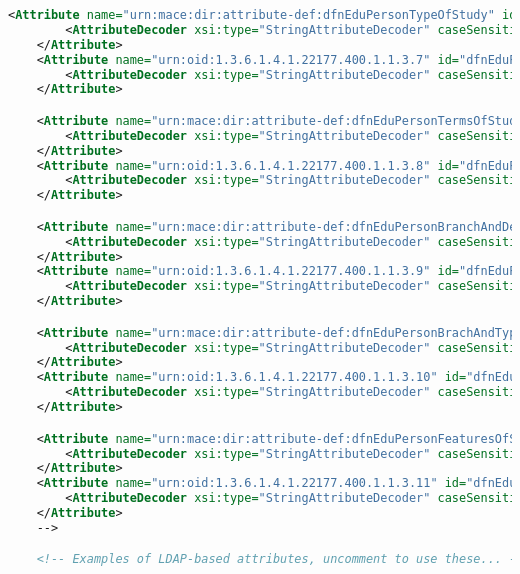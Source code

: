\begin{lstlisting}[language=xml]
    <Attribute name="urn:mace:dir:attribute-def:dfnEduPersonTypeOfStudy" id="dfnEduPersonTypeOfStudy">
        <AttributeDecoder xsi:type="StringAttributeDecoder" caseSensitive="false"/>
    </Attribute>
    <Attribute name="urn:oid:1.3.6.1.4.1.22177.400.1.1.3.7" id="dfnEduPersonTypeOfStudy">
        <AttributeDecoder xsi:type="StringAttributeDecoder" caseSensitive="false"/>
    </Attribute>

    <Attribute name="urn:mace:dir:attribute-def:dfnEduPersonTermsOfStudy" id="dfnEduPersonTermsOfStudy">
        <AttributeDecoder xsi:type="StringAttributeDecoder" caseSensitive="false"/>
    </Attribute>
    <Attribute name="urn:oid:1.3.6.1.4.1.22177.400.1.1.3.8" id="dfnEduPersonTermsOfStudy">
        <AttributeDecoder xsi:type="StringAttributeDecoder" caseSensitive="false"/>
    </Attribute>

    <Attribute name="urn:mace:dir:attribute-def:dfnEduPersonBranchAndDegree" id="dfnEduPersonBranchAndDegree">
        <AttributeDecoder xsi:type="StringAttributeDecoder" caseSensitive="false"/>
    </Attribute>
    <Attribute name="urn:oid:1.3.6.1.4.1.22177.400.1.1.3.9" id="dfnEduPersonBranchAndDegree">
        <AttributeDecoder xsi:type="StringAttributeDecoder" caseSensitive="false"/>
    </Attribute>

    <Attribute name="urn:mace:dir:attribute-def:dfnEduPersonBrachAndType" id="dfnEduPersonBrachAndType">
        <AttributeDecoder xsi:type="StringAttributeDecoder" caseSensitive="false"/>
    </Attribute>
    <Attribute name="urn:oid:1.3.6.1.4.1.22177.400.1.1.3.10" id="dfnEduPersonBrachAndType">
        <AttributeDecoder xsi:type="StringAttributeDecoder" caseSensitive="false"/>
    </Attribute>

    <Attribute name="urn:mace:dir:attribute-def:dfnEduPersonFeaturesOfStudy" id="dfnEduPersonFeaturesOfStudy">
        <AttributeDecoder xsi:type="StringAttributeDecoder" caseSensitive="false"/>
    </Attribute>
    <Attribute name="urn:oid:1.3.6.1.4.1.22177.400.1.1.3.11" id="dfnEduPersonFeaturesOfStudy">
        <AttributeDecoder xsi:type="StringAttributeDecoder" caseSensitive="false"/>
    </Attribute>
    -->

    <!-- Examples of LDAP-based attributes, uncomment to use these... -->


\end{lstlisting}
